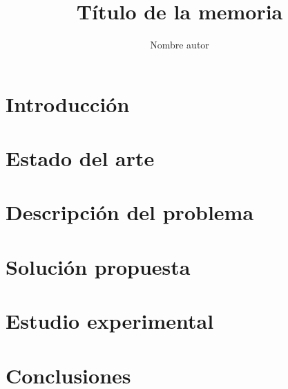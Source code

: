 \documentclass[12pt,letterpaper]{report}
\begin{document}

\title{Título de la memoria}
\author{Nombre autor}
\ingciv



\nolistoffigures
\nolistoftables

\beforepreface

\afterpreface

\onehalfspacing

\chapter{Introducción}
	

\chapter{Estado del arte}
	

\chapter{Descripción del problema}
	

\chapter{Solución propuesta}
	

\chapter{Estudio experimental}
	

\chapter{Conclusiones}
	

\singlespacing

%
\nocite{*} %

\end{document}

